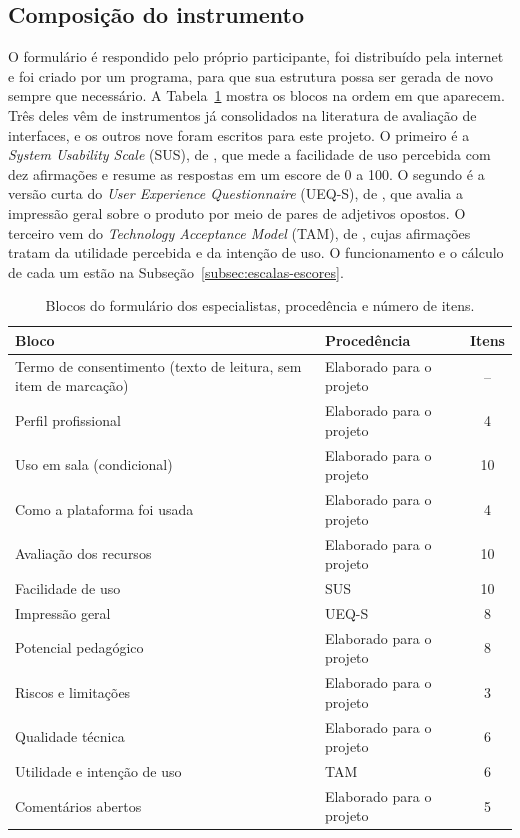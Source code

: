 \subsection{Composição do instrumento}

O formulário é respondido pelo próprio participante, foi distribuído pela internet e foi criado por um programa, para que sua estrutura possa ser gerada de novo sempre que necessário. A Tabela~\ref{tab:blocos-pa01} mostra os blocos na ordem em que aparecem. Três deles vêm de instrumentos já consolidados na literatura de avaliação de interfaces, e os outros nove foram escritos para este projeto. O primeiro é a \textit{System Usability Scale} (SUS), de , que mede a facilidade de uso percebida com dez afirmações e resume as respostas em um escore de 0 a 100. O segundo é a versão curta do \textit{User Experience Questionnaire} (UEQ-S), de , que avalia a impressão geral sobre o produto por meio de pares de adjetivos opostos. O terceiro vem do \textit{Technology Acceptance Model} (TAM), de , cujas afirmações tratam da utilidade percebida e da intenção de uso. O funcionamento e o cálculo de cada um estão na Subseção~\ref{subsec:escalas-escores}.

\begin{table}[htbp]
\centering
\caption{Blocos do formulário dos especialistas, procedência e número de itens.}
\label{tab:blocos-pa01}
\footnotesize
\renewcommand{\arraystretch}{1.2}
\begin{tabular}{|p{5.2cm}|p{4.6cm}|c|}
\hline
\textbf{Bloco} & \textbf{Procedência} & \textbf{Itens} \\\hline
Termo de consentimento (texto de leitura, sem item de marcação) & Elaborado para o projeto & -- \\\hline
Perfil profissional & Elaborado para o projeto & 4 \\\hline
Uso em sala (condicional) & Elaborado para o projeto & 10 \\\hline
Como a plataforma foi usada & Elaborado para o projeto & 4 \\\hline
Avaliação dos recursos & Elaborado para o projeto & 10 \\\hline
Facilidade de uso & SUS \cite{brooke1996} & 10 \\\hline
Impressão geral & UEQ-S \cite{schrepp2017} & 8 \\\hline
Potencial pedagógico & Elaborado para o projeto & 8 \\\hline
Riscos e limitações & Elaborado para o projeto & 3 \\\hline
Qualidade técnica & Elaborado para o projeto & 6 \\\hline
Utilidade e intenção de uso & TAM \cite{davis1989} & 6 \\\hline
Comentários abertos & Elaborado para o projeto & 5 \\\hline
\end{tabular}
\end{table}

